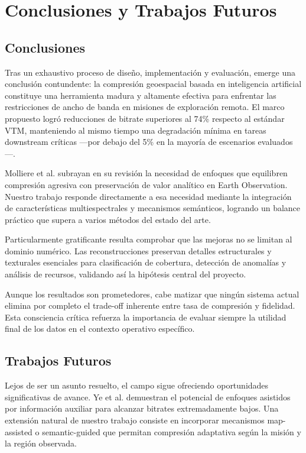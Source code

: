 \section{Conclusiones y Trabajos Futuros}

\subsection{Conclusiones}

Tras un exhaustivo proceso de diseño, implementación y evaluación, emerge una conclusión contundente: la compresión geoespacial basada en inteligencia artificial constituye una herramienta madura y altamente efectiva para enfrentar las restricciones de ancho de banda en misiones de exploración remota. El marco propuesto logró reducciones de bitrate superiores al 74\% respecto al estándar VTM, manteniendo al mismo tiempo una degradación mínima en tareas downstream críticas —por debajo del 5\% en la mayoría de escenarios evaluados—.

Molliere et al. \cite{Molliere2025_Learned_EO_Compression} subrayan en su revisión la necesidad de enfoques que equilibren compresión agresiva con preservación de valor analítico en Earth Observation. Nuestro trabajo responde directamente a esa necesidad mediante la integración de características multiespectrales y mecanismos semánticos, logrando un balance práctico que supera a varios métodos del estado del arte.

Particularmente gratificante resulta comprobar que las mejoras no se limitan al dominio numérico. Las reconstrucciones preservan detalles estructurales y texturales esenciales para clasificación de cobertura, detección de anomalías y análisis de recursos, validando así la hipótesis central del proyecto.

Aunque los resultados son prometedores, cabe matizar que ningún sistema actual elimina por completo el trade-off inherente entre tasa de compresión y fidelidad. Esta consciencia crítica refuerza la importancia de evaluar siempre la utilidad final de los datos en el contexto operativo específico.

\subsection{Trabajos Futuros}

Lejos de ser un asunto resuelto, el campo sigue ofreciendo oportunidades significativas de avance. Ye et al. \cite{Ye2025_MAPC} demuestran el potencial de enfoques asistidos por información auxiliar para alcanzar bitrates extremadamente bajos. Una extensión natural de nuestro trabajo consiste en incorporar mecanismos map-assisted o semantic-guided que permitan compresión adaptativa según la misión y la región observada.

